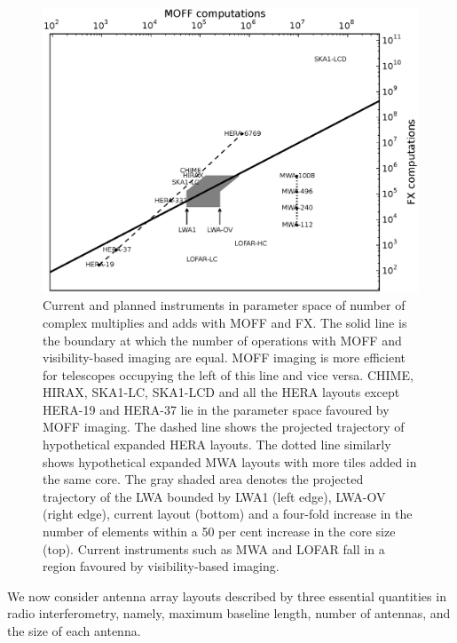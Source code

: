 \documentclass[a4paper,fleqn,usenatbib]{mnras}
\begin{document}
\begin{figure}
  \includegraphics[width=\columnwidth]{figure11}
  \caption{Current and planned instruments in parameter space of
    number of complex multiplies and adds with MOFF and FX. The solid line
    is the boundary at which the number of operations with MOFF and 
    visibility-based imaging are equal. MOFF imaging is more efficient for 
    telescopes occupying the left of this line and vice versa. CHIME, HIRAX, 
    SKA1-LC, SKA1-LCD and all the HERA layouts except HERA-19 and HERA-37 lie 
    in the parameter space favoured by MOFF imaging. The dashed line shows the 
    projected trajectory of hypothetical expanded HERA layouts. The dotted line 
    similarly shows hypothetical expanded MWA layouts with more tiles added in 
    the same core. The gray shaded area denotes the projected trajectory of the 
    LWA bounded by LWA1 (left edge), LWA-OV (right edge), current layout 
    (bottom) and a four-fold increase in the number of elements within a 50 per 
    cent increase in the core size (top). Current instruments such as MWA and 
    LOFAR fall in a region favoured by visibility-based imaging.}
  \label{fig:parameter-space-computations-instruments}
\end{figure}

We now consider antenna array layouts described by three essential quantities 
in radio interferometry, namely, maximum baseline length, number of antennas,
and the size of each antenna. 
\end{document}
